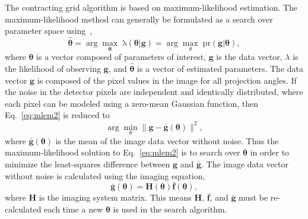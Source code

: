 The contracting grid algorithm is based on maximum-likelihood estimation.  The maximum-likelihood method can generally be formulated as a search over parameter space using~\citep{Barrett2004},
%
\begin{equation}
\label{eq:mlem2}
\mathrm{\boldsymbol{\hat{\theta}}} = \arg\max_{\mathbf{\theta}} \; \mathrm{\lambda (\boldsymbol{\theta} | \mathbf{g})} = \arg\max_{\theta} \; \mathrm{pr( \mathbf{g}|\boldsymbol{\theta})},
\end{equation}
%
where $\boldsymbol{\theta}$ is a vector composed of parameters of interest, $\mathbf{g}$ is the data vector, $\lambda$ is the likelihood of observing $\mathbf{g}$, and $\boldsymbol{\hat{\theta}}$ is a vector of estimated parameters.  The data vector $\mathrm{\mathbf{g}}$ is composed of the pixel values in the image for all projection angles.  If the noise in the detector pixels are independent and identically distributed, where each pixel can be modeled using a zero-mean Gaussian function, then Eq.~\ref{eq:mlem2} is reduced to
%
\begin{equation}
\arg\min_{\theta} \| \mathbf{g} - \mathbf{\bar{g}}(\boldsymbol{\theta}) \|^2,
\label{eq:least_square}
\end{equation}
%
where $\mathbf{\bar{g}}(\boldsymbol{\theta})$ is the mean of the image data vector without noise.  Thus the maximum-likelihood solution to Eq.~\ref{eq:mlem2} is to search over $\boldsymbol{\theta}$ in order to minimize the least-squares difference between $\mathrm{\mathbf{g}}$ and $\mathrm{\mathbf{\bar{g}}}$.  The image data vector without noise is calculated using the imaging equation,
%
\begin{equation}
\mathrm{\mathbf{ \bar{g}(\boldsymbol{\theta} ) } } = \mathrm{\mathbf{H}( \boldsymbol{\theta} )} \mathrm{\mathbf{\bar{f}} \boldsymbol{(\theta) }},
\end{equation}
%
where $\mathrm{\mathbf{H}}$ is the imaging system matrix.  This means $\mathrm{\mathbf{H}}$, $\mathrm{\mathbf{\bar{f}}}$, and $\mathrm{\mathbf{\bar{g}}}$ must be re-calculated each time a new $\boldsymbol{\theta}$ is used in the search algorithm.  

